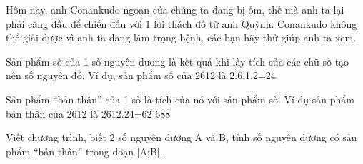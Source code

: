 Hôm nay, anh Conankudo ngoan của chúng ta đang bị ốm, thế mà anh ta lại phải căng đầu để chiến đấu với 1 lời thách đố từ anh Quỳnh. Conankudo không thể giải được vì anh ta đang lâm trọng bệnh, các bạn hãy thử giúp anh ta xem.  

   Sản phẩm số của 1 số nguyên dương là kết quả khi lấy tích của các chữ số tạo nên số nguyên đó. Ví dụ, sản phẩm số của 2612 là 2.6.1.2=24  

   Sản phẩm “bản thân” của 1 số      là tích của nó với sản phẩm số. Ví dụ sản phẩm bản thân của 2612 là 2612.24=62 688  

   Viết chương trình, biết 2 số nguyên dương A và B, tính số nguyên dương có sản phẩm “bản thân” trong đoạn [A;B].